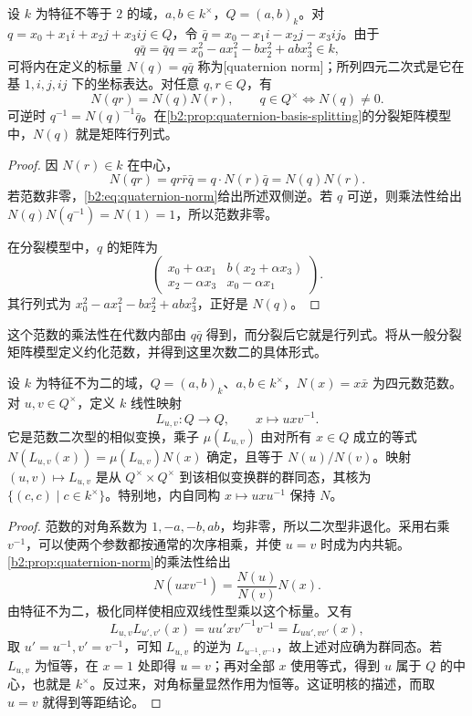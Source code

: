 \begin{proposition}\label{b2:prop:quaternion-norm}
	设 \(k\) 为特征不等于 \(2\) 的域，\(a,b\in k^\times\)，\(Q=(a,b)_k\)。对 \(q=x_0+x_1i+x_2j+x_3ij\in Q\)，令 \(\bar q=x_0-x_1i-x_2j-x_3ij\)。由于
	\[
		q\bar q=\bar q q=x_0^2-a x_1^2-b x_2^2+ab x_3^2\in k,
	\]
	可将内在定义的标量 \(N(q)=q\bar q\) 称为[quaternion norm]；所列四元二次式是它在基 \(1,i,j,ij\) 下的坐标表达。对任意 \(q,r\in Q\)，有
	\[
		N(qr)=N(q)N(r),\qquad q\in Q^\times\Longleftrightarrow N(q)\ne0.
	\]
	可逆时 \(q^{-1}=N(q)^{-1}\bar q\)。在\cref{b2:prop:quaternion-basis-splitting}的分裂矩阵模型中，\(N(q)\) 就是矩阵行列式。
\end{proposition}
\begin{proof}
	因 \(N(r)\in k\) 在中心，
	\[
		N(qr)=qr\bar r\bar q=q\cdot N(r)\bar q=N(q)N(r).
	\]
	若范数非零，\eqref{b2:eq:quaternion-norm}给出所述双侧逆。若 \(q\) 可逆，则乘法性给出 \(N(q)N(q^{-1})=N(1)=1\)，所以范数非零。

	在分裂模型中，\(q\) 的矩阵为
	\[
		\begin{pmatrix}
			x_0+\alpha x_1&b(x_2+\alpha x_3)\\
			x_2-\alpha x_3&x_0-\alpha x_1
		\end{pmatrix}.
	\]
	其行列式为 \(x_0^2-a x_1^2-bx_2^2+abx_3^2\)，正好是 \(N(q)\)。
\end{proof}

这个范数的乘法性在代数内部由 \(q\bar q\) 得到，而分裂后它就是行列式。将从一般分裂矩阵模型定义约化范数，并得到这里次数二的具体形式。

\begin{proposition}\label{b2:prop:quaternion-norm-similitudes}
	设 \(k\) 为特征不为二的域，\(Q=(a,b)_k\)、\(a,b\in k^\times\)，\(N(x)=x\bar x\) 为四元数范数。对 \(u,v\in Q^\times\)，定义 \(k\) 线性映射
	\[
		L_{u,v}:Q\longrightarrow Q,\qquad x\longmapsto uxv^{-1}.
	\]
	它是范数二次型的相似变换，乘子 \(\mu(L_{u,v})\) 由对所有 \(x\in Q\) 成立的等式 \(N(L_{u,v}(x))=\mu(L_{u,v})N(x)\) 确定，且等于 \(N(u)/N(v)\)。映射 \((u,v)\mapsto L_{u,v}\) 是从 \(Q^\times\times Q^\times\) 到该相似变换群的群同态，其核为 \(\{(c,c)\mid c\in k^\times\}\)。特别地，内自同构 \(x\mapsto uxu^{-1}\) 保持 \(N\)。
\end{proposition}
\begin{proof}
	范数的对角系数为 \(1,-a,-b,ab\)，均非零，所以二次型非退化。采用右乘 \(v^{-1}\)，可以使两个参数都按通常的次序相乘，并使 \(u=v\) 时成为内共轭。\cref{b2:prop:quaternion-norm}的乘法性给出
	\[
		N(uxv^{-1})=\frac{N(u)}{N(v)}N(x).
	\]
	由特征不为二，极化同样使相应双线性型乘以这个标量。又有
	\[
		L_{u,v}L_{u',v'}(x)=uu'xv'^{-1}v^{-1} =L_{uu',vv'}(x),
	\]
	取 \(u'=u^{-1},v'=v^{-1}\)，可知 \(L_{u,v}\) 的逆为 \(L_{u^{-1},v^{-1}}\)，故上述对应确为群同态。若 \(L_{u,v}\) 为恒等，在 \(x=1\) 处即得 \(u=v\)；再对全部 \(x\) 使用等式，得到 \(u\) 属于 \(Q\) 的中心，也就是 \(k^\times\)。反过来，对角标量显然作用为恒等。这证明核的描述，而取 \(u=v\) 就得到等距结论。
\end{proof}

